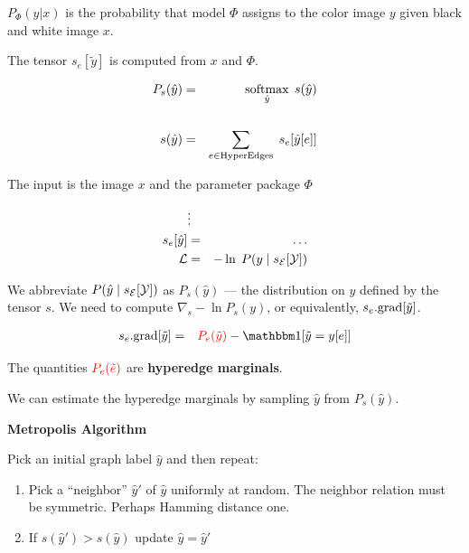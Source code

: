 {\vfill
$P_\Phi(\hat{y}|x)$ is the probability that model $\Phi$ assigns to the color image $y$ given black and white image $x$.


The tensor $s_e[\tilde{y}]$ is computed from $x$ and $\Phi$.

\vfill
\begin{eqnarray*}
P_s(\hat{y}) & = &\operatorname*{softmax}_{\hat{y}}\;s(\hat{y}) \\
\\
s(\hat{y}) & = & \sum_{e \in \mathrm{HyperEdges}}  \; s_e[\hat{y}[e]]
\end{eqnarray*}


The input is the image $x$ and the parameter package $\Phi$

\begin{eqnarray*}
 & \vdots & \\
s_e[\hat{y}] & = & \ldots \\
{\cal L} & = & - \ln\; P(y\;|\;s_{\cal E}[{\cal Y}])
\end{eqnarray*}

\vfill We abbreviate $P(\hat{y}\;|\;s_{\cal E}[{\cal Y}])$ as {\color{red} $P_s(\hat{y})$} --- the distribution on $\hat{y}$ defined by the tensor $s$.
\vfill
We need to compute {\color{red} $\nabla_s -\ln P_s(y)$}, or equivalently, {\color{red} $s_e.\mathrm{grad}[\tilde{y}]$}.

\begin{eqnarray*}
s_e.\mathrm{grad}[\tilde{y}] & = &  {\color{red} P_e(\tilde{y})} - \bbone[\tilde{y} = y[e]]
\end{eqnarray*}


The quantities ${\color{red} P_e(\tilde{e})}$ are {\bf hyperedge marginals}.

\vfill
We can estimate the hyperedge marginals by sampling $\hat{y}$ from $P_s(\hat{y})$.


\centerline{\bf Metropolis Algorithm}

\vfill
Pick an initial graph label $\hat{y}$ and then repeat:

\begin{enumerate}
\item Pick a ``neighbor'' $\hat{y}'$ of $\hat{y}$ uniformly at random.  The neighbor relation must be symmetric.  Perhaps Hamming distance one.

  \vfill
\item If $s(\hat{y}') > s(\hat{y})$ update $\hat{y} = \hat{y}'$


\end{enumerate}}
